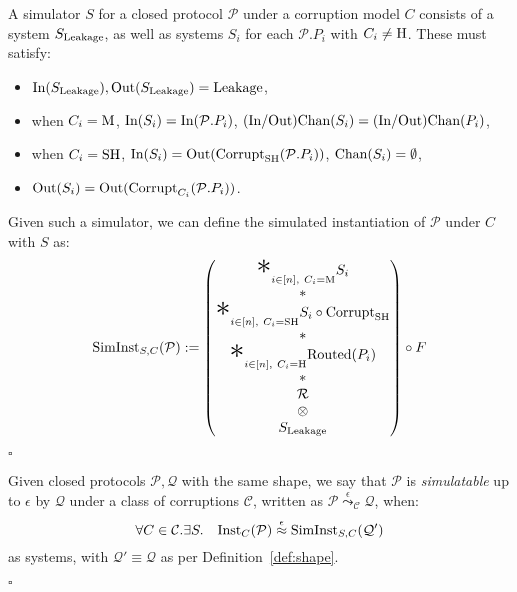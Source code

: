 \begin{definition}
  A simulator $S$ for a closed protocol $\mathcal{P}$ under a corruption
  model $C$ consists of a system $S_{\text{Leakage}}$,
  as well as systems $S_i$ for each
  $\mathcal{P}.P_i$ with $C_i \neq \text{H}$.
  These must satisfy:
  \begin{itemize}
    \item $\text{In}(S_{\text{Leakage}}), \text{Out}(S_{\text{Leakage}}) = \text{Leakage}$,
    \item when $C_i = \text{M}$, $\text{In}(S_i) = \text{In}(\mathcal{P}.P_i)$, $\text{(In/Out)Chan}(S_i) = \text{(In/Out)Chan}(P_i)$,
    \item when $C_i = \text{SH}$, $\text{In}(S_i) = \text{Out}(\text{Corrupt}_{\text{SH}}(\mathcal{P}.P_i))$, $\text{Chan}(S_i) = \emptyset$,
    \item $\text{Out}(S_i) = \text{Out}(\text{Corrupt}_{C_i}(\mathcal{P}.P_i))$.
  \end{itemize}

  Given such a simulator, we can define the simulated instantiation
  of $\mathcal{P}$ under $C$ with $S$ as:
  $$
  \tx{SimInst}_{S, C}(\mathcal{P}) := 
  \begin{pmatrix}
    {\displaystyle \bigast}_{i \in [n],\ C_i = \tx{M}} S_i\cr
    *\cr
    {\displaystyle \bigast}_{i \in [n],\ C_i = \tx{SH}} S_i \circ \tx{Corrupt}_{\tx{SH}}\cr
    *\cr
    {\displaystyle \bigast}_{i \in [n],\ C_i = \tx{H}} \tx{Routed}(P_i)\cr
    *\cr
    \mathcal{R}\cr
    \otimes\cr
    S_\tx{Leakage}
  \end{pmatrix}
  \circ F
  $$

  $\square$
\end{definition}

\begin{definition}[Simulatability]
  Given closed protocols $\mathcal{P}, \mathcal{Q}$ with the same shape,
  we say that $\mathcal{P}$ is \emph{simulatable} up to $\epsilon$ by $\mathcal{Q}$
  under a class of corruptions $\mathcal{C}$,
  written as $\mathcal{P} \overset{\epsilon}{\leadsto}_{\mathcal{C}} \mathcal{Q}$,
  when:
  $$
  \forall C \in \mathcal{C}.\exists S.\quad \text{Inst}_C(\mathcal{P}) \overset{\epsilon}{\approx} \text{SimInst}_{S, C}(\mathcal{Q}')
  $$
  as systems, with $\mathcal{Q}' \equiv \mathcal{Q}$ as per 
  Definition~\ref{def:shape}.

  $\square$
\end{definition}

